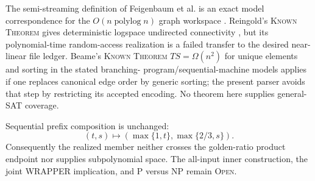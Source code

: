 The semi-streaming definition of Feigenbaum et al. is an exact model
correspondence for the $O(n\operatorname{polylog}n)$ graph workspace
\cite{rsr0005Semistream}.  Reingold's \textsc{Known Theorem} gives
deterministic logspace undirected connectivity \cite{rsr0005Reingold}, but its
polynomial-time random-access realization is a failed transfer to the desired
near-linear file ledger.  Beame's \textsc{Known Theorem}
$TS=\Omega(n^2)$ for unique elements and sorting in the stated branching-
program/sequential-machine models \cite{rsr0005Beame} applies if one replaces
canonical edge order by generic sorting; the present parser avoids that step
by restricting its accepted encoding.  No theorem here supplies general-SAT
coverage.

Sequential prefix composition is unchanged:
\[
 (t,s)\longmapsto(\max\{1,t\},\max\{2/3,s\}).
\]
Consequently the realized member neither crosses the golden-ratio product
endpoint nor supplies subpolynomial space.  The all-input inner construction,
the joint WRAPPER implication, and P versus NP remain \textsc{Open}.
